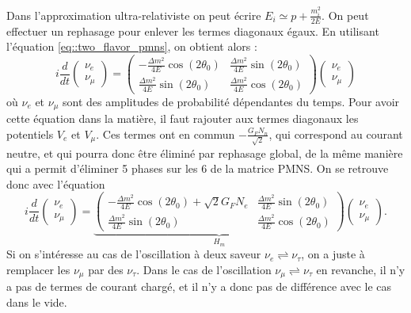         Dans l'approximation ultra-relativiste on peut écrire $E_i \simeq p+ \frac{m_i^2}{2E}$. On peut effectuer un rephasage pour enlever les termes diagonaux égaux. En utilisant l'équation \eqref{eq::two_flavor_pmns}, on obtient alors :
        \begin{equation}
          i\frac{d}{dt}\left(\begin{matrix}\nu_e \\ \nu_{\mu}\end{matrix}\right) = \left(\begin{matrix}-\frac{\Delta m^2}{4E}\cos(2\theta_0) & \frac{\Delta m^2}{4E}\sin(2\theta_0) \\ \frac{\Delta m^2}{4E}\sin(2\theta_0) & \frac{\Delta m^2}{4E}\cos(2\theta_0)\end{matrix}\right)\left(\begin{matrix}\nu_e \\ \nu_{\mu}\end{matrix}\right)
        \end{equation}
        où $\nu_e$ et $\nu_{\mu}$ sont des amplitudes de probabilité dépendantes du temps. Pour avoir cette équation dans la matière, il faut rajouter aux termes diagonaux les potentiels $V_e$ et $V_{\mu}$. Ces termes ont en commun $-\frac{G_F N_n}{\sqrt{2}}$, qui correspond au courant neutre, et qui pourra donc être éliminé par rephasage global, de la même manière qui a permit d'éliminer 5 phases sur les 6 de la matrice PMNS. On se retrouve donc avec l'équation
        \begin{equation}\label{eq::hamiltonian_matter_2flavor}
          i\frac{d}{dt}\left(\begin{matrix}\nu_e \\ \nu_{\mu}\end{matrix}\right) = \underbrace{\left(\begin{matrix}-\frac{\Delta m^2}{4E}\cos(2\theta_0)+\sqrt{2}G_F N_e & \frac{\Delta m^2}{4E}\sin(2\theta_0) \\ \frac{\Delta m^2}{4E}\sin(2\theta_0) & \frac{\Delta m^2}{4E}\cos(2\theta_0)\end{matrix}\right)}_{H_m}\left(\begin{matrix}\nu_e \\ \nu_{\mu}\end{matrix}\right).
        \end{equation}
        Si on s'intéresse au cas de l'oscillation à deux saveur $\nu_e\rightleftharpoons\nu_{\tau}$, on a juste à remplacer les $\nu_{\mu}$ par des $\nu_{\tau}$. Dans le cas de l'oscillation $\nu_{\mu}\rightleftharpoons\nu_{\tau}$ en revanche, il n'y a pas de termes de courant chargé, et il n'y a donc pas de différence avec le cas dans le vide.
        
